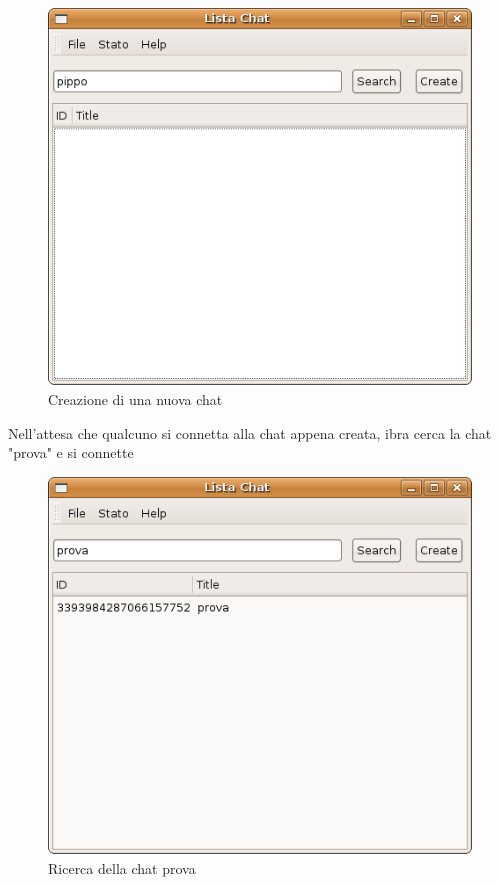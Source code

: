 \begin{figure}[H]
\begin{center}
\includegraphics[scale=0.5]{etc/crea_chat2.png}
\caption{Creazione di una nuova chat}
\label{creachat2}
\end{center}
\end{figure}
Nell'attesa che qualcuno si connetta alla chat appena creata, ibra cerca la chat "prova" e si connette
\begin{figure}[H]
\begin{center}
\includegraphics[scale=0.5]{etc/ricerca_chat_2.png}
\caption{Ricerca della chat prova}
\label{ricercachat2}
\end{center}
\end{figure}
